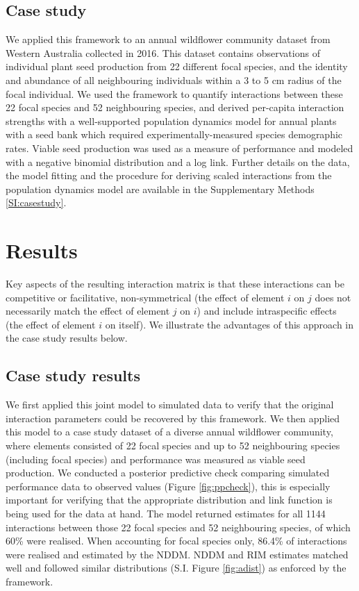 \documentclass[a4,12pt]{article}
\begin{document}
    \subsection{Case study}

      
        We applied this framework to an annual wildflower community dataset from Western Australia collected in 2016. This dataset contains observations of individual plant seed production from 22 different focal species, and the identity and abundance of all neighbouring individuals within a 3 to 5 cm radius of the focal individual. We used the framework to quantify interactions between these 22 focal species and 52 neighbouring species, and derived per-capita interaction strengths with a well-supported population dynamics model for annual plants with a seed bank \parencite{Levine2009, Mayfield2017, Bimler2018} which required experimentally-measured species demographic rates. Viable seed production was used as a measure of performance and modeled with a negative binomial distribution and a log link.
        Further details on the data, the model fitting and the procedure for deriving scaled interactions from the population dynamics model are available in the Supplementary Methods \ref{SI:casestudy}.


\section{Results}


    Key aspects of the resulting interaction matrix is that these interactions can be competitive or facilitative, non-symmetrical (the effect of element $i$ on $j$ does not necessarily match the effect of element $j$ on $i$) and include intraspecific effects (the effect of element $i$ on itself). We illustrate the advantages of this approach in the case study results below. 


    \subsection{Case study results}

    We first applied this joint model to simulated data to verify that the original interaction parameters could be recovered by this framework. We then applied this model to a case study dataset of a diverse annual wildflower community, where elements consisted of 22 focal species and up to 52 neighbouring species (including focal species) and performance was measured as viable seed production. We conducted a posterior predictive check comparing simulated performance data to observed values (Figure \ref{fig:ppcheck}), this is especially important for verifying that the appropriate distribution and link function is being used for the data at hand. The model returned estimates for all 1144 interactions between those 22 focal species and 52 neighbouring species, of which 60\% were realised.  When accounting for focal species only, 86.4\% of interactions were realised and estimated by the NDDM. NDDM and RIM estimates matched well and followed similar distributions (S.I. Figure \ref{fig:adist}) as enforced by the framework. 
    
\end{document}
